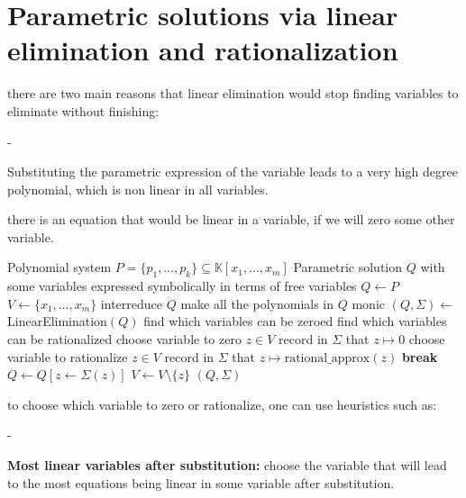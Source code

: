 \section*{Parametric solutions via linear elimination and rationalization}
there are two main reasons that linear elimination would stop finding variables to eliminate without finishing: 

\begin{list}{-}{}
    \item Substituting the parametric expression of the variable leads to a very high degree polynomial, which is non linear in all variables.
    \item there is an equation that would be linear in a variable, if we will zero some other variable.
\end{list}

\begin{algorithm}[H]
\caption{Parametric solution via linear elimination and rationalization}
\begin{algorithmic}[1]
\Require Polynomial system $P=\{p_1,\dots,p_k\}\subseteq \mathbb{K}[x_1,\dots,x_m]$
\Ensure Parametric solution $Q$ with some variables expressed symbolically in terms of free variables
    \State $Q \gets P$
    \State $V \gets \{x_1,\dots,x_m\}$
        \State interreduce $Q$ 
        \State make all the polynomials in $Q$ monic 
        \State $(Q,\Sigma) \gets$ LinearElimination$(Q)$ 
        \State find which variables can be zeroed 
        \State find which variables can be rationalized 
            \State choose variable to zero $z \in V$
            \State record in $\Sigma$ that $z \mapsto 0$
            \State choose variable to rationalize $z \in V$
            \State record in $\Sigma$ that $z \mapsto \text{rational\_approx}(z)$
        \Else
            \State \textbf{break}
        \EndIf
        \State $Q \gets Q[z \leftarrow \Sigma(z)]$
        \State $V \gets V\setminus \{z\}$
    \EndWhile
    \State \Return $(Q,\Sigma)$
\end{algorithmic}
\end{algorithm}

to choose which variable to zero or rationalize, one can use heuristics such as:
\begin{list}{-}{}
    \item \textbf{Most linear variables after substitution:} choose the variable that will lead to the most equations being linear in some variable after substitution.
\end{list}
